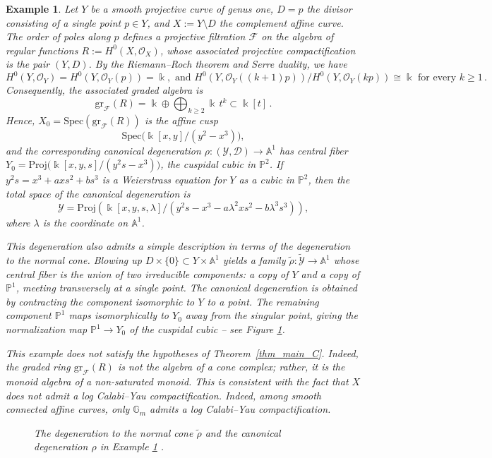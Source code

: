 \documentclass[12pt,letterpaper, reqno]{amsart}
\theoremstyle{defstyle} \newtheorem{definition}[theorem]{Definition}
\newtheorem{example}[theorem]{Example}
\theoremstyle{remark}
\numberwithin{equation}{section}
\numberwithin{figure}{section}
\newcommand{\Spec} {\mathrm{Spec}}
\newcommand{\Proj} {\mathrm{Proj}}
\newcommand{\gr} {\mathrm{gr}}
\newcommand{\kk} {\Bbbk}
\newcommand{\A} {\mathbb{A}}
\newcommand{\G} {\mathbb{G}}
\newcommand{\PP} {\mathbb{P}}
\newcommand{\cY} {\mathcal{Y}}
\begin{document}
\begin{example} \label{ex_cusp}
Let $Y$ be a smooth projective curve of genus one, $D=p$ the divisor consisting of a single point $p\in Y$, and $X:=Y\setminus D$ the complement affine curve. The order of poles along $p$ defines a projective filtration $\mathcal F$ on the algebra of regular functions 
$R:=H^0(X,\mathcal O_X)$,
whose associated projective compactification is the pair $(Y,D)$. By the Riemann--Roch theorem and Serre duality,
we have
\[ H^0(Y,\mathcal O_Y)=H^0(Y,\mathcal O_Y(p))=\kk,\text{     and    } 
H^0(Y,\mathcal O_Y((k+1)p))/H^0(Y,\mathcal O_Y(kp))\cong \kk\text{   for every   }k\ge1\,.\] 
Consequently, the associated graded algebra is
\[
\gr_{\mathcal F}(R)
=\kk\oplus\bigoplus_{k\ge2}\kk\,t^k
\subset \kk[t]\,.
\]
Hence, $X_0=\Spec(\gr_{\mathcal F}(R))$
is the affine cusp
\[ \Spec\bigl(\kk[x,y]/(y^2-x^3)\bigr),
\]
and the corresponding canonical degeneration
$\rho:(\mathcal Y,\mathcal D)\longrightarrow\A^1$
has central fiber $
Y_0=\Proj\!\bigl(\kk[x,y,s]/(y^2s-x^3)\bigr)$, 
the cuspidal cubic in $\PP^2$.
If
$y^2s=x^3+axs^2+bs^3$
is a Weierstrass equation for $Y$ as a cubic in $\PP^2$, then the total space of the canonical degeneration is
\[
\mathcal Y=
\Proj\!\left(
\kk[x,y,s,\lambda]/
(y^2s-x^3-a\lambda^2 xs^2-b\lambda^3s^3)
\right),
\]
where $\lambda$ is the coordinate on $\A^1$.

This degeneration also admits a simple description in terms of the degeneration to the normal cone. Blowing up $D\times\{0\}\subset Y\times\A^1$ yields a family $\widetilde{\rho}: \widetilde{\cY} \rightarrow \A^1$ whose central fiber is the union of two irreducible components: a copy of $Y$ and a copy of $\PP^1$, meeting transversely at a single point. The canonical degeneration is obtained by contracting the component isomorphic to $Y$ to a point. The remaining component $\PP^1$ maps isomorphically to $Y_0$ away from the singular point, giving the normalization map
$\PP^1\longrightarrow Y_0$
of the cuspidal cubic -- see Figure \ref{fig:fig3}.

This example does not satisfy the hypotheses of Theorem~\ref{thm_main_C}. Indeed, the graded ring $\gr_{\mathcal F}(R)$ is not the algebra of a cone complex; rather, it is the monoid algebra of a non-saturated monoid. This is consistent with the fact that $X$ does not admit a log Calabi--Yau compactification. Indeed, among smooth connected affine curves, only $\G_m$ admits a log Calabi--Yau compactification.


\begin{figure}[htbp]
\center{\scalebox{.6}{}}
\caption{The degeneration to the normal cone $\widetilde{\rho}$ and the canonical degeneration $\rho$ in Example \ref{ex_cusp} .}
\label{fig:fig3}
\end{figure}

\end{example}
\end{document}
